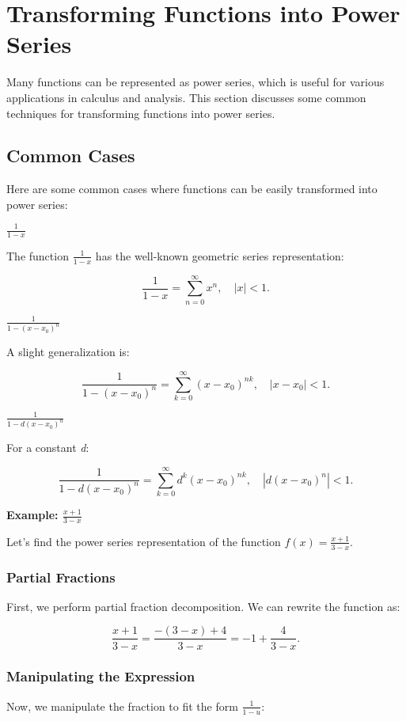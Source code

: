 \newpage
\section{Transforming Functions into Power Series}

Many functions can be represented as power series, which is useful for various applications in calculus 
and analysis. This section discusses some common techniques for transforming functions into power series.

\subsection{Common Cases}
Here are some common cases where functions can be easily transformed into power series:

\(\frac{1}{1 - x}\)

The function \(\frac{1}{1 - x}\) has the well-known geometric series representation:

\[
    \frac{1}{1 - x} = \sum_{n=0}^{\infty} x^n, \quad |x| < 1.
\]

\(\frac{1}{1 - {(x - x_0)}^n}\)

A slight generalization is:

\[
    \frac{1}{1 - {(x - x_0)}^n} = \sum_{k=0}^{\infty} {(x - x_0)}^{nk}, \quad |x - x_0| < 1.
\]

\(\frac{1}{1 - d{(x - x_0)}^n}\)

For a constant \emph{d}:

\[
    \frac{1}{1 - d{(x - x_0)}^n} = \sum_{k=0}^{\infty} d^k {(x - x_0)}^{nk}, \quad |d{(x - x_0)}^n| < 1.
\]

\textbf{Example: \(\frac{x + 1}{3 - x}\)}
\vspace{\baselineskip}

Let's find the power series representation of the function \(f(x) = \frac{x + 1}{3 - x}\).

\subsubsection{Partial Fractions}

First, we perform partial fraction decomposition. We can rewrite the function as:

\[
    \frac{x + 1}{3 - x} = \frac{-(3 - x) + 4}{3 - x} = -1 + \frac{4}{3 - x}.
\]

\subsubsection{Manipulating the Expression}
Now, we manipulate the fraction to fit the form \(\frac{1}{1 - u}\):

